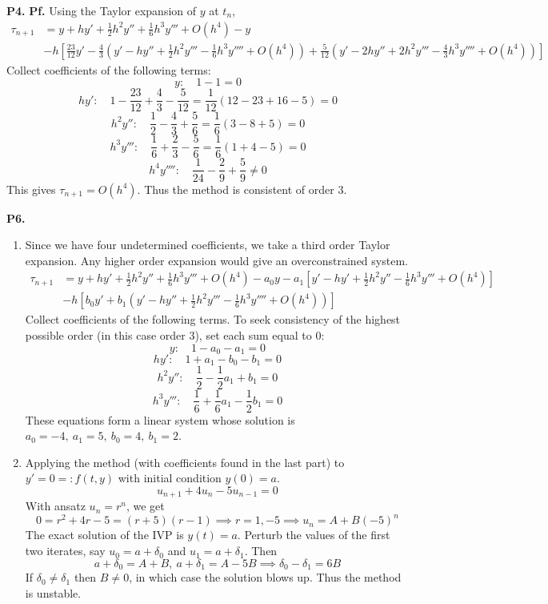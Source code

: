 \documentclass{article}
\def\tbf#1{\textbf{#1}}
\newcommand{\br}[1]{\left(#1\right)}
\newcommand{\sbr}[1]{\left[#1\right]}
\newcommand{\pf}{\tbf{Pf. }}
\newcommand{\imp}{\implies}
\newcommand{\sep}[1][.5cm]{\vspace{#1}}
\begin{document}
\tbf{P4.} \pf Using the Taylor expansion of $y$ at $t_n$,
\begin{align*}
	\tau_{n+1} &= y + hy' + \frac12h^2y'' + \frac16h^3y''' + O(h^4) - y \\
	& - h\sbr{\frac{23}{12}y' - \frac43\br{y' - hy'' + \frac12h^2y''' - \frac16h^3y'''' + O(h^4)} + \frac{5}{12}\br{y' - 2hy'' + 2h^2y''' - \frac43h^3y'''' + O(h^4)}}
\end{align*}
Collect coefficients of the following terms:
$$y: \quad 1 - 1 = 0$$
$$hy': \quad 1 - \frac{23}{12} + \frac43 - \frac{5}{12} = \frac{1}{12}(12-23+16-5) = 0$$
$$h^2y'': \quad \frac12 - \frac43 + \frac56 = \frac16(3-8+5) = 0$$
$$h^3y''': \quad \frac16 + \frac23 - \frac56 = \frac16(1+4-5) = 0$$
$$h^4y'''': \quad \frac{1}{24} - \frac29 + \frac59 \ne 0$$
This gives $\tau_{n+1}=O(h^4)$. Thus the method is consistent of order 3.
\sep



\tbf{P6.}

\begin{enumerate}[label=(\alph*)]
	
\item Since we have four undetermined coefficients, we take a third order Taylor expansion. Any higher order expansion would give an overconstrained system.
\begin{align*}
	\tau_{n+1} &= y + hy' + \frac12h^2y'' + \frac16h^3y''' + O(h^4) - a_0y - a_1\sbr{y' - hy' + \frac12h^2y'' - \frac16h^3y''' + O(h^4)}\\
	& - h\sbr{b_0y' + b_1(y' - hy'' + \frac12h^2y''' - \frac16h^3y'''' + O(h^4))}
\end{align*}
Collect coefficients of the following terms. To seek consistency of the highest possible order (in this case order 3), set each sum equal to 0:
$$y: \quad 1 - a_0 - a_1 = 0$$
$$hy': \quad 1 + a_1 - b_0 - b_1 = 0$$
$$h^2y'': \quad \frac12 - \frac12a_1 + b_1 = 0$$
$$h^3y''': \quad \frac16+ \frac16a_1 - \frac12b_1 = 0$$
These equations form a linear system whose solution is $a_0=-4,~a_1=5,~b_0=4,~b_1=2$.


\item Applying the method (with coefficients found in the last part) to $y'=0=:f(t,y)$ with initial condition $y(0)=a$.
$$u_{n+1} + 4u_n - 5u_{n-1} = 0$$
With ansatz $u_n=r^n$, we get
$$0 = r^2+4r-5 = (r+5)(r-1)
\imp r=1,-5
\imp u_n = A + B(-5)^n$$
The exact solution of the IVP is $y(t)=a$. Perturb the values of the first two iterates, say $u_0=a+\delta_0$ and $u_1=a+\delta_1$. Then
$$a+\delta_0 = A+B,~a+\delta_1 = A-5B
\imp \delta_0 - \delta_1 = 6B$$
If $\delta_0\ne\delta_1$ then $B\ne0$, in which case the solution blows up. Thus the method is unstable.


\end{enumerate}
\end{document}
